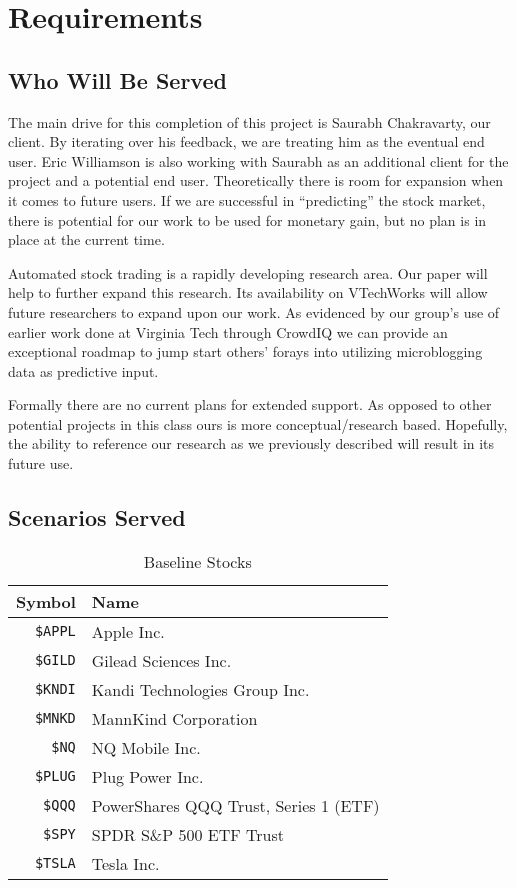 
\section{Requirements}

\subsection{Who Will Be Served}

The main drive for this completion of this project is Saurabh Chakravarty, our client. By iterating over his feedback, we are treating him as the eventual end user. Eric Williamson is also working with Saurabh as an additional client for the project and a potential end user.  Theoretically there is room for expansion when it comes to future users. If we are successful in “predicting” the stock market, there is potential for our work to be used for monetary gain, but no plan is in place at the current time. 

Automated stock trading is a rapidly developing research area. Our paper will help to further expand this research. Its availability on VTechWorks will allow future researchers to expand upon our work.  As evidenced by our group's use of earlier work done at Virginia Tech through CrowdIQ we can provide an exceptional roadmap to jump start others' forays into utilizing microblogging data as predictive input.  

Formally there are no current plans for extended support. As opposed to other potential projects in this class ours is more conceptual/research based. Hopefully, the ability to reference our research as we previously described will result in its future use.

\subsection{Scenarios Served}

\begin{table}
  \centering
  \begin{tabular}{ | r | l | }
    \hline
    Symbol & Name \\ \hline
    \texttt{\$APPL} & Apple Inc. \\ \hline
    \texttt{\$GILD} & Gilead Sciences Inc. \\ \hline
    \texttt{\$KNDI} & Kandi Technologies Group Inc. \\ \hline
    \texttt{\$MNKD} & MannKind Corporation \\ \hline
    \texttt{\$NQ} & NQ Mobile Inc. \\\hline
    \texttt{\$PLUG} & Plug Power Inc. \\\hline
    \texttt{\$QQQ} & PowerShares QQQ Trust, Series 1 (ETF) \\\hline
    \texttt{\$SPY} & SPDR S\&P 500 ETF Trust \\\hline
    \texttt{\$TSLA} & Tesla Inc. \\\hline
  \end{tabular}
  \caption{Baseline Stocks}\label{tab:stocks}
\end{table}

